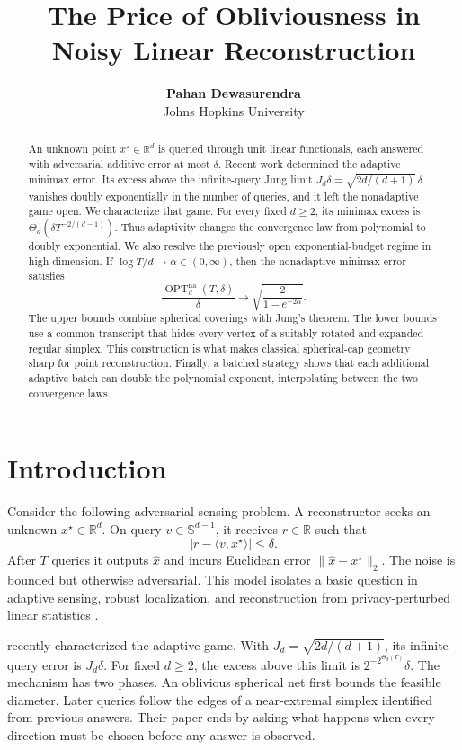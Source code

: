 \documentclass{article}
\title{The Price of Obliviousness in Noisy Linear Reconstruction}
\author{\textbf{Pahan Dewasurendra} \\ Johns Hopkins University}
\newcommand{\R}{\mathbb{R}}
\newcommand{\Sph}{\mathbb{S}}
\newcommand{\ip}[2]{\langle #1,#2\rangle}
\newcommand{\OPT}{\operatorname{OPT}}
\newcommand{\na}{\mathrm{na}}
\theoremstyle{definition}
\begin{document}
\maketitle

\begin{abstract}
An unknown point $x^\star\in\R^d$ is queried through unit linear functionals, each answered with adversarial additive error at most $\delta$.  Recent work determined the adaptive minimax error.  Its excess above the infinite-query Jung limit $J_d\delta=\sqrt{2d/(d+1)}\,\delta$ vanishes doubly exponentially in the number of queries, and it left the nonadaptive game open.  We characterize that game.  For every fixed $d\geq2$, its minimax excess is $\Theta_d(\delta T^{-2/(d-1)})$.  Thus adaptivity changes the convergence law from polynomial to doubly exponential.  We also resolve the previously open exponential-budget regime in high dimension.  If $\log T/d\to\alpha\in(0,\infty)$, then the nonadaptive minimax error satisfies \[ \frac{\OPT^{\na}_d(T,\delta)}{\delta} \longrightarrow \sqrt{\frac{2}{1-e^{-2\alpha}}}. \] The upper bounds combine spherical coverings with Jung's theorem.  The lower bounds use a common transcript that hides every vertex of a suitably rotated and expanded regular simplex.  This construction is what makes classical spherical-cap geometry sharp for point reconstruction.  Finally, a batched strategy shows that each additional adaptive batch can double the polynomial exponent, interpolating between the two convergence laws.
\end{abstract}

\section{Introduction}

Consider the following adversarial sensing problem.  A reconstructor seeks an unknown $x^\star\in\R^d$.  On query $v\in\Sph^{d-1}$, it receives $r\in\R$ such that
\begin{equation}
    |r-\ip{v}{x^\star}|\leq\delta.                 \label{eq:model}
\end{equation}
After $T$ queries it outputs $\widehat x$ and incurs Euclidean error $\|\widehat x-x^\star\|_2$.  The noise is bounded but otherwise adversarial. This model isolates a basic question in adaptive sensing, robust localization, and reconstruction from privacy-perturbed linear statistics \citep{haupt2009adaptive,ariascatro2013fundamental,dinur2003revealing}.

\citet{filmus2026optimal} recently characterized the adaptive game.  With $J_d=\sqrt{2d/(d+1)}$, its infinite-query error is $J_d\delta$.  For fixed $d\geq2$, the excess above this limit is $2^{-2^{\Theta_d(T)}}\delta$.  The mechanism has two phases.  An oblivious spherical net first bounds the feasible diameter.  Later queries follow the edges of a near-extremal simplex identified from previous answers.  Their paper ends by asking what happens when every direction must be chosen before any answer is observed.
\end{document}
